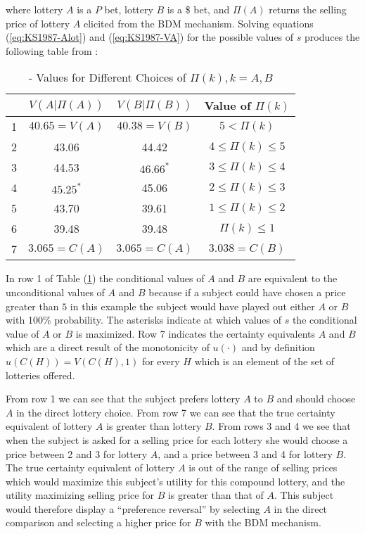 \documentclass[11pt,a4paper]{report}
\begin{document}
\noindent where lottery $A$ is a $P$ bet, lottery $B$ is a \$ bet, and $\Pi(A)$ returns the selling price of lottery $A$ elicited from the BDM mechanism.
Solving equations (\ref{eq:KS1987-Alot}) and (\ref{eq:KS1987-VA}) for the possible values of $s$ produces the following table from \textcite[679]{Karni1987}:

\begin{table}[ht]
	\centering
	\caption{ \textcite{Karni1987} - Values for Different Choices of $\Pi(k),k = A,B$}
	\label{tb:KS1987:Pi}
	\begin{tabular}{cccc}
		   & $V(A|\Pi(A))$  & $V(B|\Pi(B))$  & Value of $\Pi(k)$      \\\hline
		1  & $40.65 = V(A)$ & $40.38 = V(B)$ & $5 < \Pi(k)$           \\
		2  & 43.06          & 44.42          & $4 \leq \Pi(k) \leq 5$ \\
		3  & 44.53          & $46.66^*$      & $3 \leq \Pi(k) \leq 4$ \\
		4  & $45.25^*$      & 45.06          & $2 \leq \Pi(k) \leq 3$ \\
		5  & 43.70          & 39.61          & $1 \leq \Pi(k) \leq 2$ \\
		6  & 39.48          & 39.48          & $\Pi(k) \leq 1$        \\\hline
		7  & $3.065 = C(A)$ & $3.065 = C(A)$ & $3.038 = C(B)$
	\end{tabular}
\end{table}

In row 1 of Table (\ref{tb:KS1987:Pi}) the conditional values of $A$ and $B$ are equivalent to the unconditional values of $A$ and $B$ because if a subject could have chosen a price greater than $5$ in this example the subject would have played out either $A$ or $B$ with 100\% probability.
The asterisks indicate at which values of $s$ the conditional value of $A$ or $B$ is maximized.
Row 7 indicates the certainty equivalents $A$ and $B$ which are a direct result of the monotonicity of $u(\cdot)$ and by definition $u(C(H)) = V(C(H),1)$ for every $H$ which is an element of the set of lotteries offered. 

From row 1 we can see that the subject prefers lottery $A$ to $B$ and should choose $A$ in the direct lottery choice.
From row 7 we can see that the true certainty equivalent of lottery $A$ is greater than lottery $B$.
From rows 3 and 4 we see that when the subject is asked for a selling price for each lottery she would choose a price between 2 and 3 for lottery $A$, and a price between 3 and 4 for lottery $B$.
The true certainty equivalent of lottery $A$ is out of the range of selling prices which would maximize this subject's utility for this compound lottery, and the utility maximizing selling price for $B$ is greater than that of $A$.
This subject would therefore display a \enquote{preference reversal} by selecting $A$ in the direct comparison and selecting a higher price for $B$ with the BDM mechanism.
\end{document}
